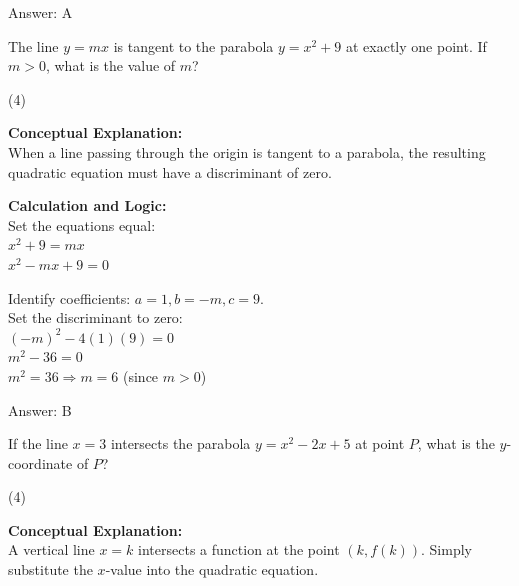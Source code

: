 \documentclass[11pt,paper=a4,answers]{exam}
\begin{document}
\begin{questions}
\begin{solution}
Answer: \colorbox{yellow!100}{A}
\end{solution}

\question
The line $y = mx$ is tangent to the parabola $y = x^2 + 9$ at exactly one point. If $m > 0$, what is the value of $m$?
\begin{tasks}(4)
\end{tasks}

\begin{solution}
\textbf{Conceptual Explanation:} \\
When a line passing through the origin is tangent to a parabola, the resulting quadratic equation must have a discriminant of zero.

\vspace{20pt}

\textbf{Calculation and Logic:} \\
Set the equations equal: \\
$x^2 + 9 = mx$ \\
$x^2 - mx + 9 = 0$

\vspace{10pt}

Identify coefficients: $a = 1, b = -m, c = 9$. \\
Set the discriminant to zero: \\
$(-m)^2 - 4(1)(9) = 0$ \\
$m^2 - 36 = 0$ \\
$m^2 = 36 \Rightarrow m = 6$ (since $m > 0$)

\vspace{25pt}

Answer: \colorbox{yellow!100}{B}
\end{solution}

\vspace{40pt}

\question
If the line $x = 3$ intersects the parabola $y = x^2 - 2x + 5$ at point $P$, what is the $y$-coordinate of $P$?
\begin{tasks}(4)
\end{tasks}

\begin{solution}
\textbf{Conceptual Explanation:} \\
A vertical line $x = k$ intersects a function at the point $(k, f(k))$. Simply substitute the $x$-value into the quadratic equation.


\end{solution}
\end{questions}
\end{document}

